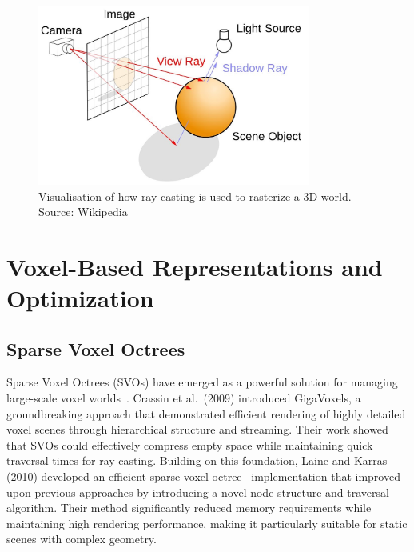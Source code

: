 \begin{figure}[thp]
    \begin{center}
        \includegraphics[width=0.8\textwidth]{figures/ray_tracing.jpg}
    \end{center}
    \caption{Visualisation of how ray-casting is used to rasterize a 3D world. Source: Wikipedia}
\end{figure}

\section{Voxel-Based Representations and Optimization}

\subsection{Sparse Voxel Octrees}
Sparse Voxel Octrees (SVOs) have emerged as a powerful solution for managing large-scale voxel
worlds~\cite{crassin2009gigavoxels}. Crassin et al.\ (2009) introduced GigaVoxels, a groundbreaking approach that
demonstrated efficient rendering of highly detailed voxel scenes through hierarchical structure and streaming. Their
work showed that SVOs could effectively compress empty space while maintaining quick traversal times for ray casting.
Building on this foundation, Laine and Karras (2010) developed an efficient sparse voxel octree~\cite{laine2010efficient}
implementation that improved upon previous approaches by introducing a novel node structure and traversal algorithm.
Their method significantly reduced memory requirements while maintaining high rendering performance, making it
particularly suitable for static scenes with complex geometry.

